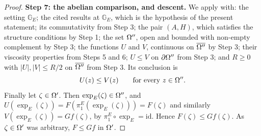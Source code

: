 \begin{proof}
\medskip\noindent\textbf{Step 7: the abelian comparison, and descent.} We apply
 with: the setting $\mathbb G_E$; the cited results at
$\mathbb G_E$, which is the hypothesis of the present statement; its
commutativity from Step 3; the pair $(A,H)$, which satisfies the structure conditions by
Step 1; the set $\Omega''$, open and bounded with non-empty complement by Step 3; the functions
$U$ and $V$, continuous on $\overline{\Omega''}$ by Step 3; their viscosity properties from
Steps 5 and 6; $U\le V$ on $\partial\Omega''$ from Step 3; and $R\ge0$ with $|U|,|V|\le R/2$ on
$\overline{\Omega''}$ from Step 3. Its conclusion is
\[
 U(z)\le V(z)\qquad\text{for every } z\in\Omega'' .
\]
Finally let $\zeta\in\Omega'$. Then $\exp_E(\zeta)\in\Omega''$, and
$U(\exp_E(\zeta))=F(\pi_1^E(\exp_E(\zeta)))=F(\zeta)$ and similarly
$V(\exp_E(\zeta))=Gf(\zeta)$, by $\pi_1^E\circ\exp_E=\mathrm{id}$. Hence
$F(\zeta)\le Gf(\zeta)$. As $\zeta\in\Omega'$ was arbitrary, $F\le Gf$ in $\Omega'$.
\end{proof}
